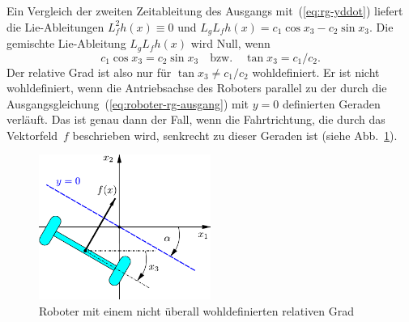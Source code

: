 \begin{example}
\begin{maxima}\end{maxima}

Ein Vergleich der zweiten Zeitableitung des Ausgangs mit~(\ref{eq:rg-yddot})
liefert die Lie-Ableitungen $L_{f}^{2}h(x)\equiv0$ und $L_{g}L_{f}h(x)=c_{1}\cos x_{3}-c_{2}\sin x_{3}$.
Die gemischte Lie-Ableitung $L_{g}L_{f}h(x)$ wird Null, wenn 
\[
c_{1}\cos x_{3}=c_{2}\sin x_{3}\quad\text{bzw.}\quad\tan x_{3}=c_{1}/c{}_{2}.
\]
Der relative Grad ist also nur für $\tan x_{3}\neq c_{1}/c_{2}$ wohldefiniert.
Er ist nicht wohldefiniert, wenn die Antriebs\-achse des Roboters
parallel zu der durch die Ausgangsgleichung~(\ref{eq:roboter-rg-ausgang})
mit $y=0$ definierten Geraden verläuft. Das ist genau dann der Fall,
wenn die Fahrtrichtung, die durch das Vektorfeld~$f$ beschrieben
wird, senkrecht zu dieser Geraden ist (siehe Abb.~\ref{fig:Roboter-rel-grad-gerade}).
\end{example}
\begin{figure}
\begin{centering}
\includegraphics[width=0.5\textwidth]{Roboter_rel_Grad_mod}
\par\end{centering}
\caption{Roboter mit einem nicht überall wohldefinierten relativen Grad\label{fig:Roboter-rel-grad-gerade}}
\end{figure}


